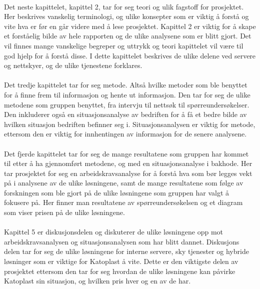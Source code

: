 \paragraph{} Det neste kapittelet, kapittel 2, tar for seg teori og ulik fagstoff for prosjektet. Her beskrives vanskelig terminologi, og ulike konsepter som er viktig å forstå og vite hva er før en går videre med å lese prosjektet. Kapittel 2 er viktig for å skape et forståelig bilde av hele rapporten og de ulike analysene som er blitt gjort. Det vil finnes mange vanskelige begreper og uttrykk og teori kapittelet vil være til god hjelp for å forstå disse. I dette kapittelet beskrives de ulike delene ved servere og nettskyer, og de ulike tjenestene forklares.

\paragraph{} Det tredje kapittelet tar for seg metode. Altså hvilke metoder som ble benyttet for å finne frem til informasjon og hente ut informasjon. Den tar for seg de ulike metodene som gruppen benyttet, fra intervju til nettsøk til spørreundersøkelser. Den inkluderer også en situasjonsanalyse av bedriften for å få et bedre bilde av hvilken situasjon bedriften befinner seg i. Situasjonsanalysen er viktig for metode, ettersom den er viktig for innhentingen av informasjon for de senere analysene.

\paragraph{} Det fjerde kapittelet tar for seg de mange resultatene som gruppen har kommet til etter å ha gjennomført metodene, og med en situasjonsanalyse i bakhode. Her tar prosjektet for seg en arbeidskravsanalyse for å forstå hva som bør legges vekt på i analysene av de ulike løsningene, samt de mange resultatene som følge av forskningen som ble gjort på de ulike løsningene som gruppen har valgt å fokusere på. Her finner man resultatene av spørreundersøkelsen og et diagram som viser prisen på de ulike løsningene. 

\paragraph{} Kapittel 5 er diskusjonsdelen og diskuterer de ulike løsningene opp mot arbeidskravsanalysen og situasjonsanalysen som har blitt dannet. Diskusjons delen tar for seg de ulike løsningene for interne servere, sky tjenester og hybride løsninger som er viktige for Katoplast å vite. Dette er den viktigste delen av prosjektet ettersom den tar for seg hvordan de ulike løsningene kan påvirke Katoplast sin situasjon, og hvilken pris hver og en av de har.

